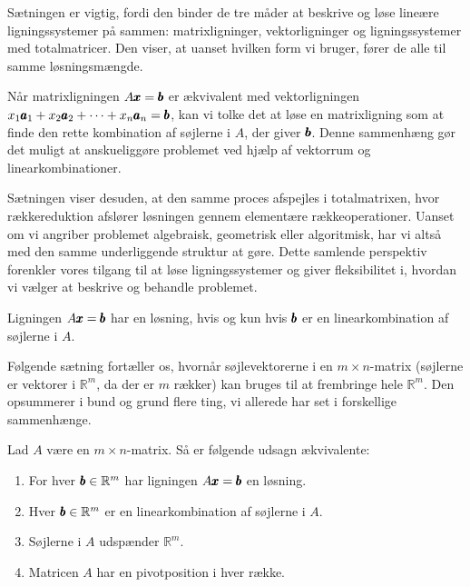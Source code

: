 Sætningen er vigtig, fordi den binder de tre måder at beskrive og løse lineære ligningssystemer på sammen: matrixligninger, vektorligninger og ligningssystemer med totalmatricer. Den viser, at uanset hvilken form vi bruger, fører de alle til samme løsningsmængde.

Når matrixligningen \( A \pmb{x} = \pmb{b} \) er ækvivalent med vektorligningen \( x_1 \pmb{a}_1 + x_2 \pmb{a}_2 + \cdots + x_n \pmb{a}_n = \pmb{b} \), kan vi tolke det at løse en matrixligning som at finde den rette kombination af søjlerne i \( A \), der giver \( \pmb{b} \). Denne sammenhæng gør det muligt at anskueliggøre problemet ved hjælp af vektorrum og linearkombinationer.

Sætningen viser desuden, at den samme proces afspejles i totalmatrixen, hvor rækkereduktion afslører løsningen gennem elementære rækkeoperationer. Uanset om vi angriber problemet algebraisk, geometrisk eller algoritmisk, har vi altså med den samme underliggende struktur at gøre. Dette samlende perspektiv forenkler vores tilgang til at løse ligningssystemer og giver fleksibilitet i, hvordan vi vælger at beskrive og behandle problemet.

\begin{remark}
    Ligningen $A \pmb{x} = \pmb{b}$ har en løsning, hvis og kun hvis $\pmb{b}$ er en linearkombination af søjlerne i $A$.
\end{remark}

Følgende sætning fortæller os, hvornår søjlevektorerne i en $m \times n$-matrix (søjlerne er vektorer i $\mathbb{R}^m$, da der er $m$ rækker) kan bruges til at frembringe hele $\mathbb{R}^m$. Den opsummerer i bund og grund flere ting, vi allerede har set i forskellige sammenhænge.

\begin{theorem}
Lad \( A \) være en \( m \times n \)-matrix. Så er følgende udsagn ækvivalente:
\begin{enumerate}[label=(\alph*)]
    \item For hver \( \pmb{b} \in \mathbb{R}^m \) har ligningen \( A \pmb{x} = \pmb{b} \) en løsning.
    \item Hver \( \pmb{b} \in \mathbb{R}^m \) er en linearkombination af søjlerne i \( A \).
    \item Søjlerne i \( A \) udspænder \( \mathbb{R}^m \).
    \item Matricen \( A \) har en pivotposition i hver række.
\end{enumerate}
\end{theorem}

